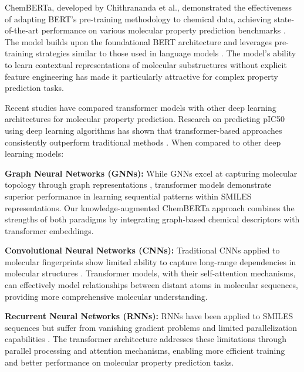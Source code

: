 \documentclass[preprint,12pt]{elsarticle}
\begin{document}
ChemBERTa, developed by Chithrananda et al., demonstrated the effectiveness of adapting BERT's pre-training methodology to chemical data, achieving state-of-the-art performance on various molecular property prediction benchmarks \cite{chithrananda2020chemberta}. The model builds upon the foundational BERT architecture \cite{devlin2018bert} and leverages pre-training strategies similar to those used in language models \cite{radford2019language,brown2020language,liu2019roberta,clark2020electra,lan2019albert}. The model's ability to learn contextual representations of molecular substructures without explicit feature engineering has made it particularly attractive for complex property prediction tasks.


Recent studies have compared transformer models with other deep learning architectures for molecular property prediction. Research on predicting pIC50 using deep learning algorithms has shown that transformer-based approaches consistently outperform traditional methods \cite{researchgate_pic50_2024}. When compared to other deep learning models:

\textbf{Graph Neural Networks (GNNs):} While GNNs excel at capturing molecular topology through graph representations \cite{duvenaud2015convolutional,kearnes2016molecular,velivckovic2017graph,kipf2016semi,hamilton2017inductive,scarselli2008graph}, transformer models demonstrate superior performance in learning sequential patterns within SMILES representations. Our knowledge-augmented ChemBERTa approach combines the strengths of both paradigms by integrating graph-based chemical descriptors with transformer embeddings.

\textbf{Convolutional Neural Networks (CNNs):} Traditional CNNs applied to molecular fingerprints show limited ability to capture long-range dependencies in molecular structures \cite{duvenaud2015convolutional,he2016deep,simonyan2014very,szegedy2015going}. Transformer models, with their self-attention mechanisms, can effectively model relationships between distant atoms in molecular sequences, providing more comprehensive molecular understanding.

\textbf{Recurrent Neural Networks (RNNs):} RNNs have been applied to SMILES sequences but suffer from vanishing gradient problems and limited parallelization capabilities \cite{liu2021molecular}. The transformer architecture addresses these limitations through parallel processing and attention mechanisms, enabling more efficient training and better performance on molecular property prediction tasks.
\end{document}
